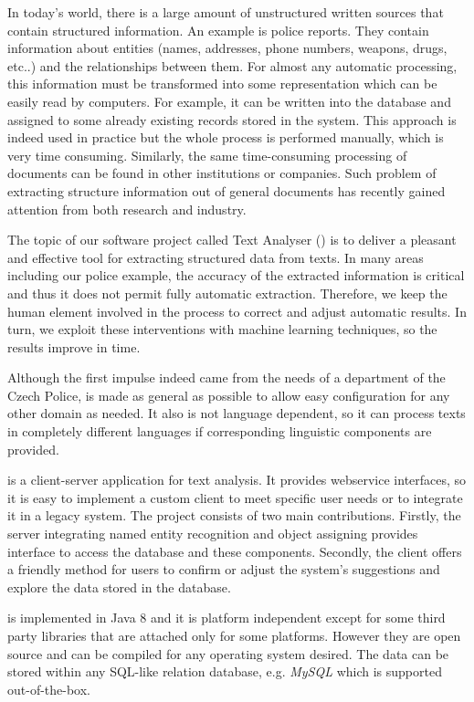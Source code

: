 
In today's world, there is a large amount of unstructured written sources that
contain structured information. An example is police reports. They contain
information about entities (names, addresses, phone numbers, weapons, drugs,
etc..) and the relationships between them. For almost any automatic processing,
this information must be transformed into some representation which can be
easily read by computers. For example, it can be written into the database and
assigned to some already existing records stored in the system. This approach is
indeed used in practice but the whole process is performed manually, which is
very time consuming. Similarly, the same time-consuming processing of documents
can be found in other institutions or companies. Such problem of extracting
structure information out of general documents has recently gained attention
from both research%
 and industry.

The topic of our software project called Text Analyser (\textan{}) is to
deliver a pleasant and effective tool for extracting structured data from texts.
In many areas including our police example, the accuracy of the extracted
information is critical and thus it does not permit fully automatic extraction.
Therefore, we keep the human element involved in the process to correct and
adjust automatic results. In turn, we exploit these interventions with machine
learning techniques, so the results improve in time.

Although the first impulse indeed came from the needs of a department of the
Czech Police, \textan{} is made as general as possible to allow easy 
configuration for any other domain as needed. It also is not language dependent,
so it can process texts in completely different languages if corresponding
linguistic components are provided.

\textan{} is a client-server application for text analysis. It provides
webservice interfaces, so it is easy to implement a custom client to meet
specific user needs or to integrate it in a legacy system. The project
consists of two main contributions. Firstly, the server integrating named entity
recognition and object assigning provides interface to access the database and
these components. Secondly, the client offers a friendly method for users to
confirm or adjust the system's suggestions and explore the data stored in the
database.

\textan{} is implemented in Java 8 and it is platform independent except for
some third party libraries that are attached only for some platforms. However
they are open source and can be compiled for any operating system desired. The
data can be stored within any SQL-like relation database, e.g. \emph{MySQL} which
is supported out-of-the-box.
